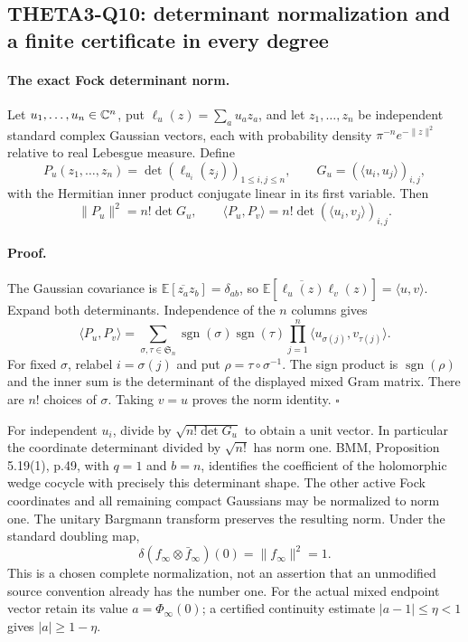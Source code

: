 \documentclass[11pt]{article}
\theoremstyle{definition}\newtheorem{definition}[theorem]{Definition}\newtheorem{remark}[theorem]{Remark}
\begin{document}
\subsection{THETA3-Q10: determinant normalization and a finite certificate in every degree}\label{Q10}

\paragraph{The exact Fock determinant norm.}
Let $u_1,\ldots,u_n\in\mathbb C^n$, put
$\ell_u(z)=\sum_a u_a z_a$, and let $z_1,\ldots,z_n$ be independent
standard complex Gaussian vectors, each with probability density
$\pi^{-n}e^{-\|z\|^2}$ relative to real Lebesgue measure. Define
\[
 P_u(z_1,\ldots,z_n)=\det(\ell_{u_i}(z_j))_{1\leq i,j\leq n},
 \qquad G_u=(\langle u_i,u_j\rangle)_{i,j},
\]
with the Hermitian inner product conjugate linear in its first
variable. Then
\begin{equation}\label{Q10-Fock}
 \|P_u\|^2=n!\det G_u,\qquad
 \langle P_u,P_v\rangle
       =n!\det(\langle u_i,v_j\rangle)_{i,j}.
\end{equation}

\paragraph{Proof.}
The Gaussian covariance is
$\mathbb E[\overline{z_a}z_b]=\delta_{ab}$, so
$\mathbb E[\overline{\ell_u(z)}\ell_v(z)]
=\langle u,v\rangle$.
Expand both determinants. Independence of the $n$ columns gives
\[
 \langle P_u,P_v\rangle
 =\sum_{\sigma,\tau\in\mathfrak S_n}
   \operatorname{sgn}(\sigma)\operatorname{sgn}(\tau)
       \prod_{j=1}^n\langle u_{\sigma(j)},v_{\tau(j)}\rangle.
\]
For fixed $\sigma$, relabel $i=\sigma(j)$ and put
$\rho=\tau\circ\sigma^{-1}$. The sign product is
$\operatorname{sgn}(\rho)$ and the inner sum is the determinant
of the displayed mixed Gram matrix. There are $n!$ choices of
$\sigma$. Taking $v=u$ proves the norm identity.
\hfill$\square$

For independent $u_i$, divide by $\sqrt{n!\det G_u}$ to obtain
a unit vector. In particular the coordinate determinant divided
by $\sqrt{n!}$ has norm one. BMM, Proposition 5.19(1), p.49,
with $q=1$ and $b=n$, identifies the coefficient of the
holomorphic wedge cocycle with precisely this determinant shape.
The other active Fock coordinates and all remaining compact
Gaussians may be normalized to norm one. The unitary Bargmann
transform preserves the resulting norm. Under the standard
doubling map,
\[
 \delta(f_\infty\otimes\bar f_\infty)(0)=\|f_\infty\|^2=1.
\]
This is a chosen complete normalization, not an assertion that
an unmodified source convention already has the number one.
For the actual mixed endpoint vector retain its value
$a=\Phi_\infty(0)$; a certified continuity estimate
$|a-1|\leq\eta<1$ gives $|a|\geq1-\eta$.
\end{document}
